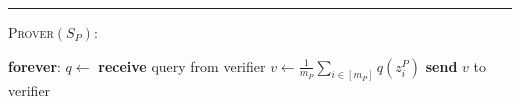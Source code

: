 \documentclass[11pt]{article}
\numberwithin{equation}{section}
\theoremstyle{definition}
\theoremstyle{plain}
\theoremstyle{definition}\newtheorem{notation}[theorem]{Notation}\theoremstyle{plain}\raggedbottom
\newcommand{\1}{\mathds{1}}
\newcommand{\mP}{m_{\scriptscriptstyle P}}
\newcommand{\samplepoint}[2]{{z_{#1}^{\scriptscriptstyle{#2}}}}
\newenvironment{ShadedAlgorithmBox}{\begin{tcolorbox}[colback=myLipicsLightGray,colframe=myLipicsLightGray,arc=-1pt]\begin{minipage}{0.975\textwidth}}{\end{minipage}\end{tcolorbox}}
\begin{document}
\begin{protocol}[H]
\begin{ShadedAlgorithmBox}
		
		\noindent\rule{\textwidth}{0.5pt}
		
		\vspace*{0.5em}
		
		\textsc{Prover}$(S_P)$:
		\begin{algorithmic}
			\vspace*{0.2em}
			\Loop \textbf{ forever}:
			\vspace*{0.2em}
			\State $q \gets$ \textbf{receive} query from verifier
			\vspace*{0.5em}
			\State $v \gets \frac{1}{\mP}\sum_{i \in [\mP]}q\left(\samplepoint{i}{P}\right)$
			\vspace*{0.5em}
			\State \textbf{send} $v$ to verifier
			\EndLoop 
		\end{algorithmic}
		
	\end{ShadedAlgorithmBox}
	
	\caption{A PAC verification protocol for statistical query algorithms.}
	\label{protocol:sq-verification}
\end{protocol}
\end{document}
